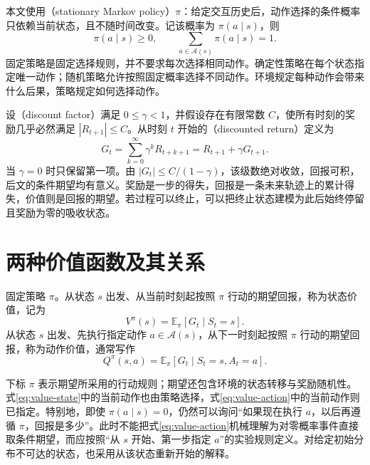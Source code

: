 \documentclass[UTF8]{ctexart}
\begin{document}
本文使用（stationary Markov policy）$\pi$：给定交互历史后，动作选择的条件概率只依赖当前状态，且不随时间改变。记该概率为 $\pi(a\mid s)$，则
\[
  \pi(a\mid s)\geq0,\qquad
  \sum_{a\in\mathcal A(s)}\pi(a\mid s)=1.
\]
固定策略是固定选择规则，并不要求每次选择相同动作。确定性策略在每个状态指定唯一动作；随机策略允许按照固定概率选择不同动作。环境规定每种动作会带来什么后果，策略规定如何选择动作。

设（discount factor）满足 $0\leq\gamma<1$，并假设存在有限常数 $C$，使所有时刻的奖励几乎必然满足 $|R_{t+1}|\leq C$。从时刻 $t$ 开始的（discounted return）定义为
\begin{equation}
  G_t=\sum_{k=0}^{\infty}\gamma^kR_{t+k+1}
     =R_{t+1}+\gamma G_{t+1}.
  \label{eq:value-return}
\end{equation}
当 $\gamma=0$ 时只保留第一项。由 $|G_t|\leq C/(1-\gamma)$，该级数绝对收敛，回报可积，后文的条件期望均有意义。奖励是一步的得失，回报是一条未来轨迹上的累计得失，价值则是回报的期望。若过程可以终止，可以把终止状态建模为此后始终停留且奖励为零的吸收状态。

\section{两种价值函数及其关系}
\label{sec:value-functions}

\begin{definition}[状态价值与动作价值]
固定策略 $\pi$。从状态 $s$ 出发、从当前时刻起按照 $\pi$ 行动的期望回报，称为状态价值，记为
\begin{equation}
  V^\pi(s)=\mathbb E_\pi[G_t\mid S_t=s].
  \label{eq:value-state}
\end{equation}
从状态 $s$ 出发、先执行指定动作 $a\in\mathcal A(s)$，从下一时刻起按照 $\pi$ 行动的期望回报，称为动作价值，通常写作
\begin{equation}
  Q^\pi(s,a)=\mathbb E_\pi[G_t\mid S_t=s,A_t=a].
  \label{eq:value-action}
\end{equation}
\end{definition}

下标 $\pi$ 表示期望所采用的行动规则；期望还包含环境的状态转移与奖励随机性。式\eqref{eq:value-state}中的当前动作也由策略选择，式\eqref{eq:value-action}中的当前动作则已指定。特别地，即使 $\pi(a\mid s)=0$，仍然可以询问“如果现在执行 $a$，以后再遵循 $\pi$，回报是多少”。此时不能把式\eqref{eq:value-action}机械理解为对零概率事件直接取条件期望，而应按照“从 $s$ 开始、第一步指定 $a$”的实验规则定义。对给定初始分布不可达的状态，也采用从该状态重新开始的解释。
\end{document}
